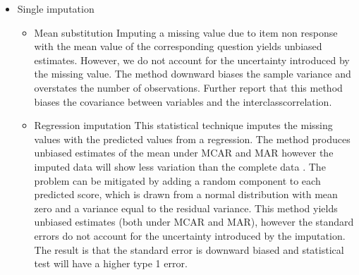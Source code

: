  \begin{itemize} 
\item Single imputation
\begin{itemize}
\item Mean substitution
Imputing a missing value due to item non response with the mean value of the corresponding question yields unbiased estimates. However, we do not account for the uncertainty introduced by the missing value. The method downward biases the sample variance and overstates the number of observations. Further \cite{schafer2002missing} report that this method biases the covariance between variables and the interclasscorrelation. 
\item  Regression imputation
This statistical technique imputes the missing values with the predicted values from a regression. The method produces unbiased estimates of the mean under MCAR and MAR however the imputed data will show less variation than the complete data \cite{baraldi2010introduction}. The problem can be mitigated by adding a random component to each predicted score, which is drawn from a normal distribution with mean zero and a variance equal to the residual variance. This method yields unbiased estimates (both under MCAR and MAR), however the standard errors do not account for the uncertainty introduced by the imputation. The result is that the standard error is downward biased and statistical test will have a higher type 1 error.
\end{itemize}  
\end{itemize}  
